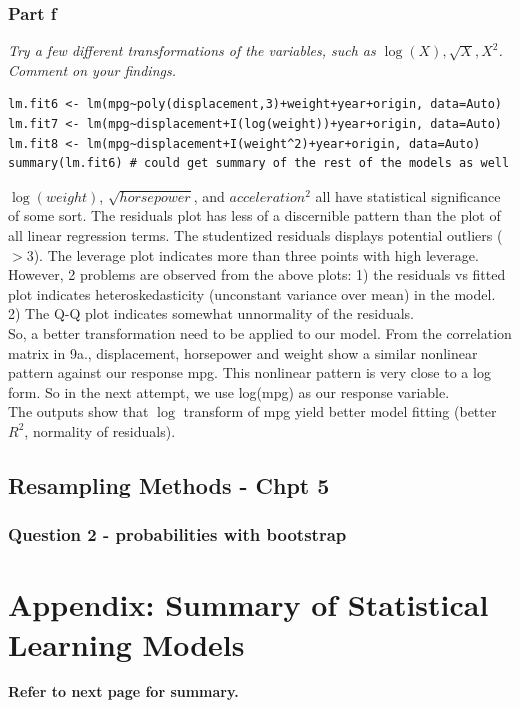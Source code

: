 \documentclass[11pt]{article}
\begin{document}
\subsubsection*{Part f}
\textit{Try a few different transformations of the variables, such as $\log(X), \sqrt{X}, X^2$. Comment on your findings.}
\begin{lstlisting}
lm.fit6 <- lm(mpg~poly(displacement,3)+weight+year+origin, data=Auto)
lm.fit7 <- lm(mpg~displacement+I(log(weight))+year+origin, data=Auto)
lm.fit8 <- lm(mpg~displacement+I(weight^2)+year+origin, data=Auto)
summary(lm.fit6) # could get summary of the rest of the models as well
\end{lstlisting}
$\log(weight)$, $\sqrt{horsepower}$, and $acceleration^2$ all have statistical significance of some sort. The residuals plot has less of a discernible pattern than the plot of all linear regression terms. The studentized residuals displays potential outliers ($>$3). The leverage plot indicates more than three points with high leverage. \\

\noindent However, 2 problems are observed from the above plots: 1) the residuals vs fitted plot indicates heteroskedasticity (unconstant variance over mean) in the model. 2) The Q-Q plot indicates somewhat unnormality of the residuals. \\

\noindent So, a better transformation need to be applied to our model. From the correlation matrix in 9a., displacement, horsepower and weight show a similar nonlinear pattern against our response mpg. This nonlinear pattern is very close to a log form. So in the next attempt, we use log(mpg) as our response variable. \\

\noindent The outputs show that $\log$ transform of mpg yield better model fitting (better $R^2$, normality of residuals).

\subsection{Resampling Methods - Chpt 5}
\subsubsection{Question 2 - probabilities with bootstrap}

\newpage
\appendix
\section{Appendix: Summary of Statistical Learning Models}
\begin{center}
    \textbf{Refer to next page for summary.}
\end{center} \phantom{i}
\end{document}
